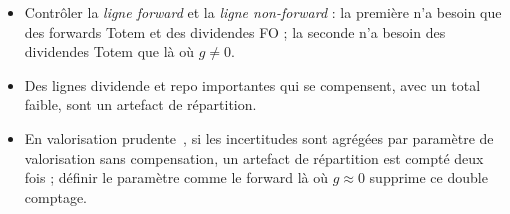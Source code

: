 \begin{insight}
\begin{itemize}[leftmargin=12pt]
\item Contrôler la \emph{ligne forward} et la \emph{ligne non-forward} : la première n'a besoin que des forwards Totem
et des dividendes FO ; la seconde n'a besoin des dividendes Totem que là où $g\neq0$.
\item Des lignes dividende et repo importantes qui se compensent, avec un total faible, sont un artefact de répartition.
\item En valorisation prudente~\cite{eu2016}, si les incertitudes sont agrégées par paramètre de valorisation sans
compensation, un artefact de répartition est compté deux fois ; définir le paramètre comme le forward là où $g\approx0$
supprime ce double comptage.
\end{itemize}
\end{insight}
